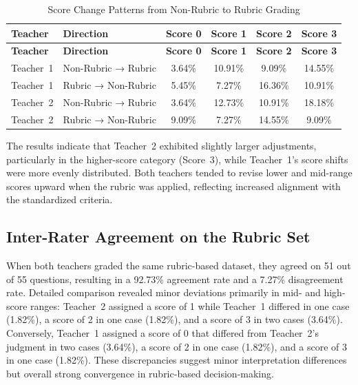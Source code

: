 {
\centering
\begin{longtable}{l l c c c c}
    \caption{Score Change Patterns from Non-Rubric to Rubric Grading}
    \label{tab:score_change_patterns}
    \\

    \hline
    \textbf{Teacher} & \textbf{Direction} & \textbf{Score 0} & \textbf{Score 1} & \textbf{Score 2} & \textbf{Score 3} \\
    \hline
    \endfirsthead

    \hline
    \textbf{Teacher} & \textbf{Direction} & \textbf{Score 0} & \textbf{Score 1} & \textbf{Score 2} & \textbf{Score 3} \\
    \hline
    \endhead

    \hline
    \endfoot

    Teacher~1 & Non-Rubric → Rubric & 3.64\% & 10.91\% & 9.09\% & 14.55\% \\
    Teacher~1 & Rubric → Non-Rubric & 5.45\% & 7.27\% & 16.36\% & 10.91\% \\
    Teacher~2 & Non-Rubric → Rubric & 3.64\% & 12.73\% & 10.91\% & 18.18\% \\
    Teacher~2 & Rubric → Non-Rubric & 9.09\% & 7.27\% & 14.55\% & 9.09\% \\

\end{longtable}
}

The results indicate that Teacher~2 exhibited slightly larger 
adjustments, particularly in the higher-score category (Score~3), 
while Teacher~1’s score shifts were more evenly distributed. Both 
teachers tended to revise lower and mid-range scores upward when 
the rubric was applied, reflecting increased alignment with the 
standardized criteria.

\subsection{Inter-Rater Agreement on the Rubric Set}

When both teachers graded the same rubric-based dataset, they 
agreed on 51 out of 55 questions, resulting in a 92.73\% 
agreement rate and a 7.27\% disagreement rate.  
Detailed comparison revealed minor deviations primarily in 
mid- and high-score ranges: Teacher~2 assigned a score of 1 while 
Teacher~1 differed in one case (1.82\%), a score of 2 in one case 
(1.82\%), and a score of 3 in two cases (3.64\%).  
Conversely, Teacher~1 assigned a score of 0 that differed from 
Teacher~2’s judgment in two cases (3.64\%), a score of 2 in one 
case (1.82\%), and a score of 3 in one case (1.82\%).  
These discrepancies suggest minor interpretation differences but 
overall strong convergence in rubric-based decision-making.

